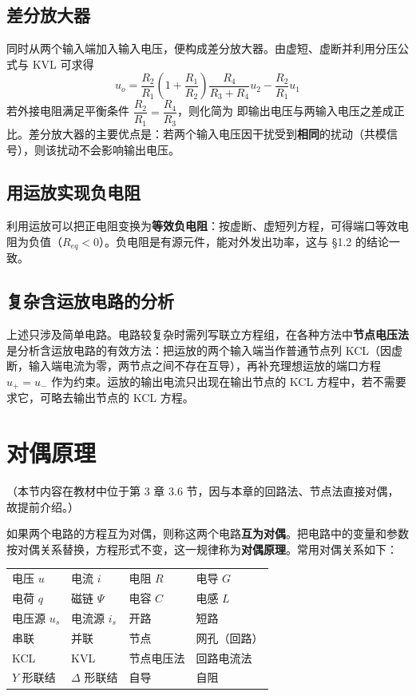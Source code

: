 \subsection{差分放大器}
同时从两个输入端加入输入电压，便构成差分放大器。由虚短、虚断并利用分压公式与 KVL 可求得
\begin{equation}
u_o=\frac{R_2}{R_1}\left(1+\frac{R_1}{R_2}\right)\frac{R_4}{R_3+R_4}u_2-\frac{R_2}{R_1}u_1
\end{equation}
若外接电阻满足平衡条件 $\dfrac{R_2}{R_1}=\dfrac{R_4}{R_3}$，则化简为
即输出电压与两输入电压之差成正比。差分放大器的主要优点是：若两个输入电压因干扰受到\textbf{相同}的扰动（共模信号），则该扰动不会影响输出电压。

\subsection{用运放实现负电阻}
利用运放可以把正电阻变换为\textbf{等效负电阻}：按虚断、虚短列方程，可得端口等效电阻为负值（$R_{eq}<0$）。负电阻是有源元件，能对外发出功率，这与 §1.2 的结论一致。

\subsection{复杂含运放电路的分析}
上述只涉及简单电路。电路较复杂时需列写联立方程组，在各种方法中\textbf{节点电压法}是分析含运放电路的有效方法：把运放的两个输入端当作普通节点列 KCL（因虚断，输入端电流为零，两节点之间不存在互导），再补充理想运放的端口方程 $u_+=u_-$ 作为约束。运放的输出电流只出现在输出节点的 KCL 方程中，若不需要求它，可略去输出节点的 KCL 方程。


\section{对偶原理}
（本节内容在教材中位于第 3 章 3.6 节，因与本章的回路法、节点法直接对偶，故提前介绍。）

如果两个电路的方程互为对偶，则称这两个电路\textbf{互为对偶}。把电路中的变量和参数按对偶关系替换，方程形式不变，这一规律称为\textbf{对偶原理}。常用对偶关系如下：

\begin{center}
\begin{tabular}{@{}llll@{}}
\toprule
电压 $u$ & 电流 $i$ & 电阻 $R$ & 电导 $G$ \\
电荷 $q$ & 磁链 $\Psi$ & 电容 $C$ & 电感 $L$ \\
电压源 $u_s$ & 电流源 $i_s$ & 开路 & 短路 \\
串联 & 并联 & 节点 & 网孔（回路） \\
KCL & KVL & 节点电压法 & 回路电流法 \\
$Y$ 形联结 & $\Delta$ 形联结 & 自导 & 自阻 \\
\bottomrule
\end{tabular}
\end{center}

